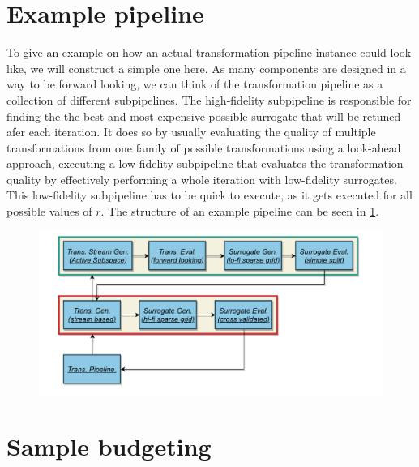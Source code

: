 \documentclass[
  a4paper,  %
  twoside,  %
  bibliography=totoc,
  headsepline,
  cleardoublepage=empty,
  parskip=half,
  draft=false
]{scrbook}
\begin{document}
\section{Example pipeline}

To give an example on how an actual transformation pipeline instance could look like, we will construct a simple one here.
As many components are designed in a way to be forward looking, we can think of the transformation pipeline as a collection of different subpipelines.
The high-fidelity subpipeline is responsible for finding the the best and most expensive possible surrogate that will be retuned afer each iteration.
It does so by usually evaluating the quality of multiple transformations from one family of possible transformations using a look-ahead approach, \ie executing a low-fidelity subpipeline that evaluates the transformation quality by effectively performing a whole iteration with low-fidelity surrogates.
This low-fidelity subpipeline has to be quick to execute, as it gets executed for all possible values of $r$.
The structure of an example pipeline can be seen in \cref{fig:tpex}.

\newpage
\begin{mdframed}[style=style]
\begin{figure}[H]
\includegraphics[width=\textwidth]{graphics/PipelineExample.pdf}
\delimit

\label{fig:tpex}
\end{figure}
\end{mdframed}


\section{Sample budgeting}
\end{document}
